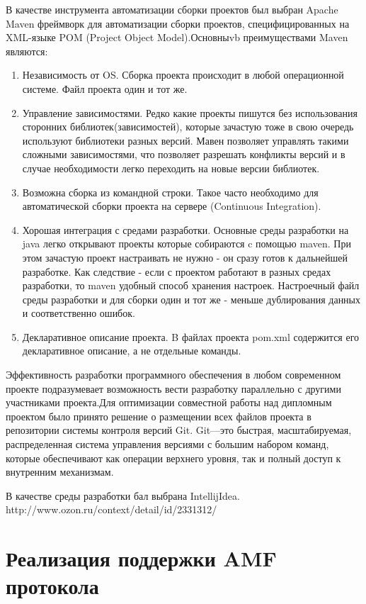 В качестве инструмента автоматизации сборки проектов был выбран Apache Maven  фреймворк для автоматизации сборки
проектов, специфицированных на XML-языке POM (Project Object Model).Основныvb преимуществами Maven являются:

\begin{enumerate}
\item Независимость от OS. Сборка проекта происходит в любой операционной системе. Файл проекта один и тот же.
\item Управление зависимостями. Редко какие проекты пишутся без использования сторонних библиотек(зависимостей), которые
 зачастую тоже в свою очередь используют библиотеки разных версий. Мавен позволяет управлять такими сложными
 зависимостями, что позволяет разрешать конфликты версий и в случае необходимости легко переходить на новые версии
 библиотек.
\item Возможна сборка из командной строки. Такое часто необходимо для автоматической сборки проекта на сервере
(Continuous Integration).
\item Хорошая интеграция с средами разработки. Основные среды разработки на java легко открывают проекты которые
собираются c помощью maven. При этом зачастую проект настраивать не нужно - он сразу готов к дальнейшей разработке.
Как следствие - если с проектом работают в разных средах разработки, то maven удобный способ хранения настроек.
Настроечный файл среды разработки и для сборки один и тот же - меньше дублирования данных и соответственно ошибок.
\item Декларативное описание проекта. B файлах проекта pom.xml содержится его декларативное описание, а не отдельные
команды.
\end{enumerate}

Эффективность разработки программного обеспечения в любом современном проекте подразумевает возможность вести
разработку параллельно с другими участниками проекта.Для оптимизации совместной работы над дипломным проектом было
принято решение о размещении всех файлов проекта в репозитории системы контроля версий Git. Git—это быстрая,
масштабируемая, распределенная система управления версиями с большим набором команд, которые обеспечивают как
операции верхнего уровня, так и полный доступ к внутренним механизмам.

В качестве среды разработки бал выбрана IntellijIdea. http://www.ozon.ru/context/detail/id/2331312/

\section{Реализация поддержки AMF протокола}

